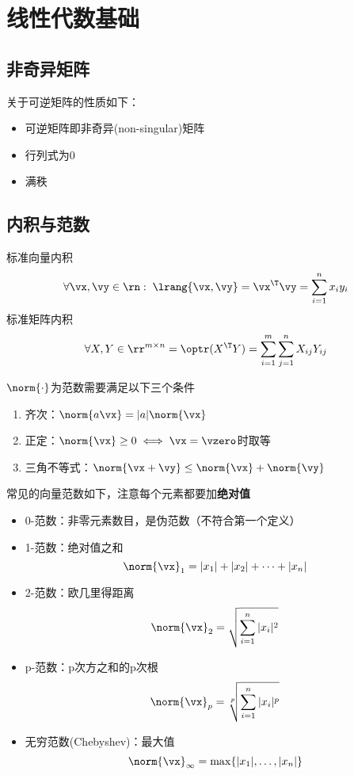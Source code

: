
\newpage
\appendix
\section{线性代数基础}
\subsection{非奇异矩阵}
关于可逆矩阵的性质如下：
\begin{itemize}
    \item 可逆矩阵即非奇异(non-singular)矩阵
    \item 行列式为$0$
    \item 满秩
\end{itemize}

\subsection{内积与范数}
\begin{definition}[标准内积]
    标准向量内积
    \[\forall \vx,\vy\in\rn:\;\lrang{\vx,\vy}=\vx^\T\vy=\sum_{i=1}^n x_iy_i\]
    标准矩阵内积
    \[\forall X,Y\in\rr^{m\times n}=\optr(X^\T Y)=\sum_{i=1}^m\sum_{j=1}^n X_{ij}Y_{ij}\]
\end{definition}
\begin{definition}[向量范数]
    $\norm{\cdot}$为范数需要满足以下三个条件
    \begin{enumerate}
        \item 齐次：$\norm{a\vx}=|a|\norm{\vx}$
        \item 正定：$\norm{\vx}\geq 0\iff \vx=\vzero$时取等
        \item 三角不等式：$\norm{\vx+\vy}\leq \norm{\vx}+\norm{\vy}$
    \end{enumerate}
\end{definition}
常见的向量范数如下，注意每个元素都要加\textbf{绝对值}
\begin{itemize}
\item 0-范数：非零元素数目，是伪范数（不符合第一个定义）
\item 1-范数：绝对值之和
\[\norm{\vx}_1=|x_1|+|x_2|+\cdots+|x_n|\]
\item 2-范数：欧几里得距离
\[\norm{\vx}_2=\sqrt{\sum_{i=1}^n |x_i|^2}\]
\item p-范数：p次方之和的p次根
\[\norm{\vx}_p=\sqrt[p]{\sum_{i=1}^n |x_i|^p}\]
\item 无穷范数(Chebyshev)：最大值
\[\norm{\vx}_\infty=\max\{|x_1|,\ldots,|x_n|\}\]
\end{itemize}
